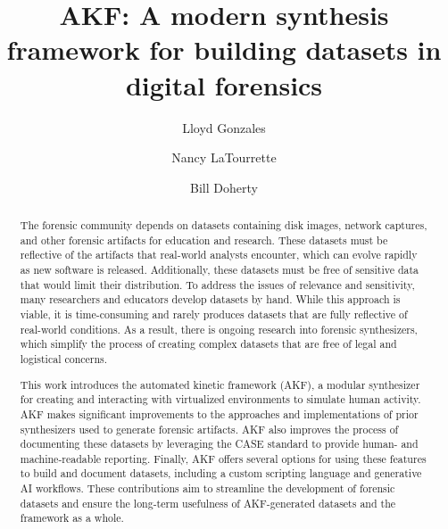 \documentclass[preprint,12pt]{elsarticle}
\begin{document}
\begin{frontmatter}

\title{AKF: A modern synthesis framework for building datasets in digital forensics}

\author[unr]{Lloyd Gonzales}
\author[unr]{Nancy LaTourrette}
\author[unr]{Bill Doherty}

\begin{abstract}
The forensic community depends on datasets containing disk images,
network captures, and other forensic artifacts for education and
research. These datasets must be reflective of the artifacts that
real-world analysts encounter, which can evolve rapidly as new software
is released. Additionally, these datasets must be free of sensitive data
that would limit their distribution. To address the issues of relevance
and sensitivity, many researchers and educators develop datasets by
hand. While this approach is viable, it is time-consuming and rarely
produces datasets that are fully reflective of real-world conditions. As
a result, there is ongoing research into forensic synthesizers, which
simplify the process of creating complex datasets that are free of legal
and logistical concerns.

This work introduces the automated kinetic framework (AKF), a modular
synthesizer for creating and interacting with virtualized environments
to simulate human activity. AKF makes significant improvements to the
approaches and implementations of prior synthesizers used to generate
forensic artifacts. AKF also improves the process of documenting these
datasets by leveraging the CASE standard to provide human- and
machine-readable reporting. Finally, AKF offers several options for
using these features to build and document datasets, including a custom
scripting language and generative AI workflows. These contributions aim
to streamline the development of forensic datasets and ensure the
long-term usefulness of AKF-generated datasets and the framework as a
whole.
\end{abstract}


\end{frontmatter}
\end{document}
